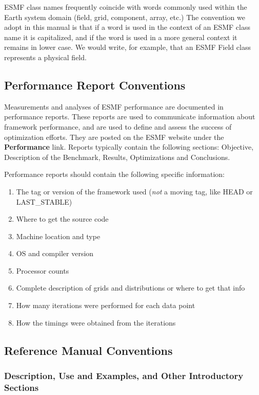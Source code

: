 ESMF class names frequently coincide with words commonly
used within the Earth system domain (field, grid, component, array, 
etc.)  The convention we adopt in this manual is that if a word is 
used in the context of an ESMF class name it is capitalized, and 
if the word is used in a more general context it remains in lower 
case.  We would write, for example, that an ESMF Field class 
represents a physical field.

\subsection{Performance Report Conventions}
Measurements and analyses of ESMF performance are documented in
performance reports.  These reports are used to communicate 
information about framework performance, and are used to
define and assess the success of optimization efforts.
They are posted on the ESMF website under the {\bf Performance}
link.  Reports typically contain the following sections:  Objective,
Description of the Benchmark,  Results, Optimizations 
and Conclusions.

Performance reports should contain the following specific 
information:
\begin{enumerate}
\item The tag or version of the framework used ({\it not} a moving tag,
like HEAD or LAST\_STABLE)
\item Where to get the source code
\item Machine location and type
\item OS and compiler version
\item Processor counts
\item Complete description of grids and distributions or where
to get that info
\item How many iterations were performed for each data point
\item How the timings were obtained from the iterations 
\end{enumerate}

\subsection{Reference Manual Conventions}

\subsubsection{Description, Use and Examples, and Other Introductory Sections}

